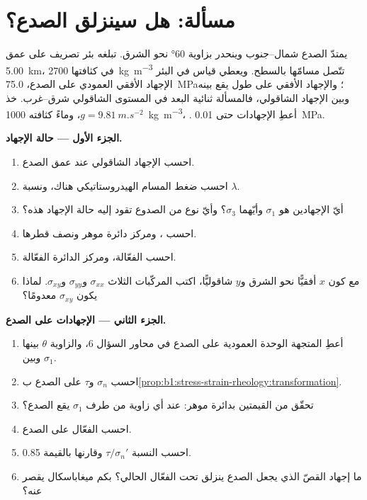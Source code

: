 \section{مسألة: هل سينزلق الصدع؟}

\begin{problem}
\label{pb:b1:stress-strain-rheology:1}
يمتدّ الصدع شمال--جنوب وينحدر بزاوية \ang{60} نحو الشرق. تبلغه بئر تصريف على عمق \qty{5.00}{km}، في  كثافتها \qty{2700}{kg.m^{-3}} تتّصل مسامّها بالسطح. ويعطي قياس في البئر الإجهاد الأفقي العمودي على الصدع، \qty{75.0}{MPa}؛ والإجهاد الأفقي على طول  يقع بينه وبين الإجهاد الشاقولي، فالمسألة ثنائية البعد في المستوى الشاقولي شرق--غرب. خذ $g = \qty{9.81}{m.s^{-2}}$، وماءً كثافته \qty{1000}{kg.m^{-3}}، . أعطِ الإجهادات حتى \qty{0.01}{MPa}.

\medskip
\noindent\textbf{الجزء الأول --- حالة الإجهاد.}
\begin{enumerate}
  \item احسب الإجهاد الشاقولي عند عمق الصدع.
  \item احسب ضغط المسام الهيدروستاتيكي هناك، ونسبة $\lambda$.
  \item أيّ الإجهادين هو $\sigma_1$ وأيّهما $\sigma_3$؟ وأيّ نوع من الصدوع تقود إليه حالة الإجهاد هذه؟
  \item احسب ، ومركز دائرة موهر ونصف قطرها.
  \item احسب  الفعّالة، ومركز الدائرة الفعّالة.
  \item مع كون $x$ أفقيًّا نحو الشرق و$y$ شاقوليًّا، اكتب المركّبات الثلاث $\sigma_{xx}$ و$\sigma_{yy}$ و$\sigma_{xy}$. لماذا يكون $\sigma_{xy}$ معدومًا؟
\end{enumerate}

\medskip
\noindent\textbf{الجزء الثاني --- الإجهادات على الصدع.}
\begin{enumerate}[resume]
  \item أعطِ المتجهة الوحدة العمودية على الصدع في محاور السؤال 6، والزاوية $\theta$ بينها وبين $\sigma_1$.
  \item احسب $\sigma_n$ و$\tau$ على الصدع ب\cref{prop:b1:stress-strain-rheology:transformation}.
  \item تحقّق من القيمتين بدائرة موهر: عند أي زاوية من طرف $\sigma_1$ يقع الصدع؟
  \item احسب  الفعّال على الصدع.
  \item احسب النسبة $\tau/\sigma_n'$ وقارنها بالقيمة 0.85.
  \item ما إجهاد القصّ الذي يجعل الصدع ينزلق تحت  الفعّال الحالي؟ بكم ميغاباسكال يقصر عنه؟
\end{enumerate}


\end{problem}
